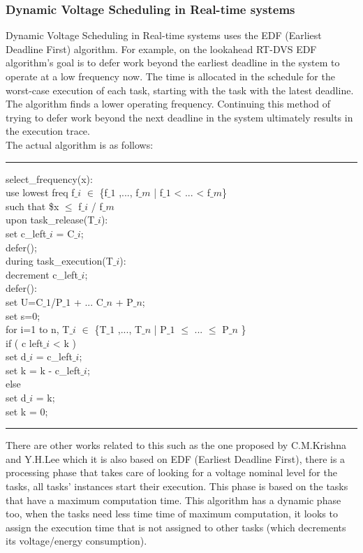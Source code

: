 \documentclass[conference]{IEEEtran}
\begin{document}
\subsubsection{Dynamic Voltage Scheduling in Real-time systems}
 Dynamic Voltage Scheduling in Real-time systems uses the EDF (Earliest Deadline First) algorithm. For example, on \cite{PADM01} the lookahead RT-DVS EDF algorithm's goal is to defer work beyond the earliest deadline in the system to operate at a low frequency now. The time is allocated in the schedule for the worst-case execution of each task, starting with the task with the latest deadline. The algorithm finds a lower operating frequency. Continuing this method of trying to defer work beyond the next deadline in the system ultimately results in the execution trace.\\
The actual algorithm is as follows:

\noindent\rule{8cm}{0.4pt}

select\_frequency(x):\\
	use lowest freq  f$\_{i}$ $\in$ \{f$\_{1}$ ,..., f$\_{m}$ | f$\_{1}$ < ... < f$\_{m}$\}\\
	such that \$x $\leq$ f$\_{i}$ / f$\_{m}$\\
	
upon task\_release(T$\_{i}$):\\
	set c\_left$\_{i}$ = C$\_{i}$;\\
	defer();\\

during task\_execution(T$\_{i}$):\\
	decrement c\_left$\_{i}$;\\
	
defer():\\
	set U=C$\_{1}$/P$\_{1}$ + ... C$\_{n}$ + P$\_{n}$;\\
	set s=0;\\
	for i=1 to n, T$\_{i}$ $\in$ \{T$\_{1}$ ,..., T$\_{n}$ | P$\_{1}$ $\leq$ ... $\leq$ P$\_{n}$ \} \\
		if ( c left$\_{i}$  < k )\\
			set d$\_{i}$  = c\_left$\_{i}$;\\
			set k = k - c\_left$\_{i}$;\\
		else\\
			set d$\_{i}$  = k;\\
			set k = 0;\\
		
\noindent\rule{8cm}{0.4pt}

There are other works related to this such as the one proposed by C.M.Krishna and Y.H.Lee \cite{KRISH01} which it is also based on EDF (Earliest Deadline First), there is a processing phase that takes care of looking for a voltage nominal level for the tasks, all tasks' instances start their execution. This phase is based on the tasks that have a maximum computation time. This algorithm has a dynamic phase too, when the tasks need less time time of maximum computation, it looks to assign the execution time that is not assigned to other tasks (which decrements its voltage/energy consumption). 
\end{document}
